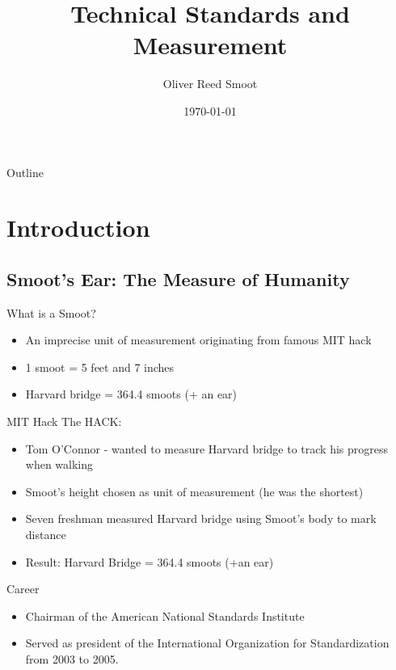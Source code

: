 \documentclass{beamer}
\title{Technical Standards and Measurement}
\author{Oliver Reed Smoot}
\institute[]{Massachusetts Institute of Technology}
\date{\today}
\begin{document}

\frame{\titlepage}

\section[Outline]{}
\begin{frame}{Outline}
  \tableofcontents
\end{frame}

\section{Introduction}
\subsection{Smoot's Ear: The Measure of Humanity}
\begin{frame}{What is a Smoot?}
  \begin{itemize}
    \item An imprecise unit of measurement originating from famous MIT hack
    \item 1 smoot = 5 feet and 7 inches
    \item Harvard bridge = 364.4 smoots (+ an ear)
  \end{itemize}
\end{frame}
\begin{frame}{MIT Hack}
  The HACK:
  \pause
  \begin{itemize}
    \item<2-> Tom O'Connor - wanted to measure Harvard bridge to track his progress when walking
    \item<3-> Smoot's height chosen as unit of measurement (he was the shortest)
    \item<4-> Seven freshman measured Harvard bridge using Smoot's body to mark distance
    \item<5-> Result: Harvard Bridge = 364.4 smoots (+an ear)
  \end{itemize}
\end{frame}
\begin{frame}{Career}
  \begin{itemize}
    \item<1-> Chairman of the American National Standards Institute 
    \item<2-> Served as president of the International Organization for Standardization from 2003 to 2005.
  \end{itemize}
\end{frame}
\end{document}
